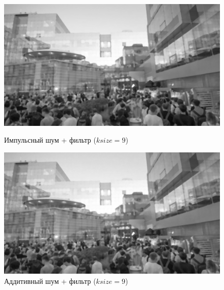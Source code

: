 \documentclass[a4paper]{article}
\begin{document}
\begin{figure}[H]
    \begin{minipage}{0.49\textwidth}
        \centering \includegraphics[width=\textwidth]{images/3_nonlinear_filters/impulse - median (ksize=9).jpg}
        \caption{Импульсный шум + фильтр ($ksize = 9$)}
    \end{minipage}\hfill
    \begin{minipage}{0.49\textwidth}
        \centering \includegraphics[width=\textwidth]{images/3_nonlinear_filters/additive - median (ksize=9).jpg}
        \caption{Аддитивный шум + фильтр ($ksize = 9$)}
    \end{minipage}
\end{figure}
\end{document}
